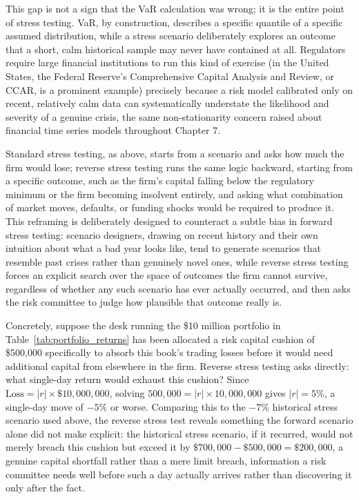 \documentclass[../ai_in_finance]{subfiles}
\begin{document}
This gap is not a sign that the VaR calculation was wrong; it is the entire point of stress testing. VaR, by construction, describes a specific quantile of a specific assumed distribution, while a stress scenario deliberately explores an outcome that a short, calm historical sample may never have contained at all.
Regulators require large financial institutions to run this kind of exercise (in the United States, the Federal Reserve's Comprehensive Capital Analysis and Review, or CCAR, is a prominent example) precisely because a risk model calibrated only on recent, relatively calm data can systematically understate the likelihood and severity of a genuine crisis, the same non-stationarity concern raised about financial time series models throughout Chapter 7.

Standard stress testing, as above, starts from a scenario and asks how much the firm would lose; reverse stress testing runs the same logic backward, starting from a specific outcome, such as the firm's capital falling below the regulatory minimum or the firm becoming insolvent entirely, and asking what combination of market moves, defaults, or funding shocks would be required to produce it.
This reframing is deliberately designed to counteract a subtle bias in forward stress testing: scenario designers, drawing on recent history and their own intuition about what a bad year looks like, tend to generate scenarios that resemble past crises rather than genuinely novel ones, while reverse stress testing forces an explicit search over the space of outcomes the firm cannot survive, regardless of whether any such scenario has ever actually occurred, and then asks the risk committee to judge how plausible that outcome really is.

Concretely, suppose the desk running the \$10 million portfolio in Table~\ref{tab:portfolio_returns} has been allocated a risk capital cushion of \$500,000 specifically to absorb this book's trading losses before it would need additional capital from elsewhere in the firm. Reverse stress testing asks directly: what single-day return would exhaust this cushion? Since $\text{Loss} = |r| \times \$10{,}000{,}000$, solving $500{,}000 = |r| \times 10{,}000{,}000$ gives $|r| = 5\%$, a single-day move of $-5\%$ or worse.
Comparing this to the $-7\%$ historical stress scenario used above, the reverse stress test reveals something the forward scenario alone did not make explicit: the historical stress scenario, if it recurred, would not merely breach this cushion but exceed it by $\$700{,}000 - \$500{,}000 = \$200{,}000$, a genuine capital shortfall rather than a mere limit breach, information a risk committee needs well before such a day actually arrives rather than discovering it only after the fact.
\end{document}

